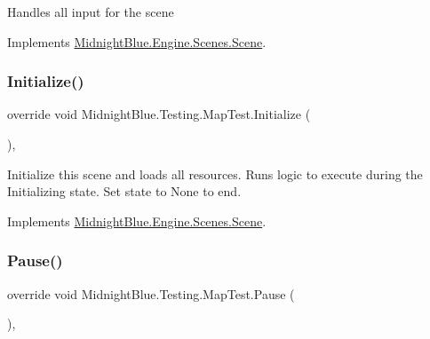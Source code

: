 Handles all input for the scene 



Implements \hyperlink{class_midnight_blue_1_1_engine_1_1_scenes_1_1_scene_a2f7849ef8976f9aeed0023448033b6fd}{Midnight\+Blue.\+Engine.\+Scenes.\+Scene}.

\hypertarget{class_midnight_blue_1_1_testing_1_1_map_test_adcaa2f37efbf5764b48d297cabf17784}{}\label{class_midnight_blue_1_1_testing_1_1_map_test_adcaa2f37efbf5764b48d297cabf17784} 
\subsubsection{\texorpdfstring{Initialize()}{Initialize()}}
{\footnotesize\ttfamily override void Midnight\+Blue.\+Testing.\+Map\+Test.\+Initialize (\begin{DoxyParamCaption}{ }\end{DoxyParamCaption})\hspace{0.3cm}{\ttfamily [inline]}, {\ttfamily [virtual]}}



Initialize this scene and loads all resources. Runs logic to execute during the Initializing state. Set state to None to end. 



Implements \hyperlink{class_midnight_blue_1_1_engine_1_1_scenes_1_1_scene_aa919101862c14384b955d91a4d3362ab}{Midnight\+Blue.\+Engine.\+Scenes.\+Scene}.

\hypertarget{class_midnight_blue_1_1_testing_1_1_map_test_a7dba960137d634b15e4f4b7b3a86489f}{}\label{class_midnight_blue_1_1_testing_1_1_map_test_a7dba960137d634b15e4f4b7b3a86489f} 
\subsubsection{\texorpdfstring{Pause()}{Pause()}}
{\footnotesize\ttfamily override void Midnight\+Blue.\+Testing.\+Map\+Test.\+Pause (\begin{DoxyParamCaption}{ }\end{DoxyParamCaption})\hspace{0.3cm}{\ttfamily [inline]}, {\ttfamily [virtual]}}



